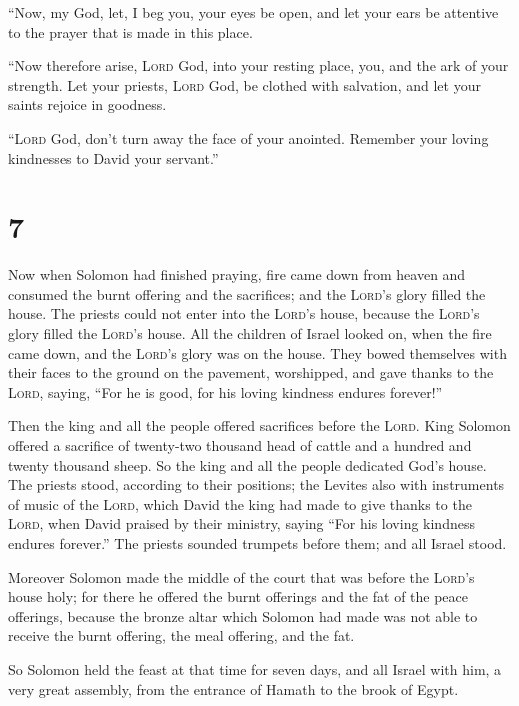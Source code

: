  ``Now, my God, let, I beg you, your eyes be open, and
let your ears be attentive to the prayer that is made in this place.

 ``Now therefore arise, \textsc{Lord} God, into your
resting place, you, and the ark of your strength. Let your priests,
\textsc{Lord} God, be clothed with salvation, and let your saints
rejoice in goodness.

 ``\textsc{Lord} God, don't turn away the face of your
anointed. Remember your loving kindnesses to David your servant.''

\hypertarget{section-6}{%
\section{7}\label{section-6}}

 Now when Solomon had finished praying, fire came down
from heaven and consumed the burnt offering and the sacrifices; and the
\textsc{Lord}'s glory filled the house.  The priests could
not enter into the \textsc{Lord}'s house, because the \textsc{Lord}'s
glory filled the \textsc{Lord}'s house.  All the children
of Israel looked on, when the fire came down, and the \textsc{Lord}'s
glory was on the house. They bowed themselves with their faces to the
ground on the pavement, worshipped, and gave thanks to the
\textsc{Lord}, saying, ``For he is good, for his loving kindness endures
forever!''

 Then the king and all the people offered sacrifices
before the \textsc{Lord}.  King Solomon offered a
sacrifice of twenty-two thousand head of cattle and a hundred and twenty
thousand sheep. So the king and all the people dedicated God's house.
 The priests stood, according to their positions; the
Levites also with instruments of music of the \textsc{Lord}, which David
the king had made to give thanks to the \textsc{Lord}, when David
praised by their ministry, saying ``For his loving kindness endures
forever.'' The priests sounded trumpets before them; and all Israel
stood.

 Moreover Solomon made the middle of the court that was
before the \textsc{Lord}'s house holy; for there he offered the burnt
offerings and the fat of the peace offerings, because the bronze altar
which Solomon had made was not able to receive the burnt offering, the
meal offering, and the fat.

 So Solomon held the feast at that time for seven days,
and all Israel with him, a very great assembly, from the entrance of
Hamath to the brook of Egypt.

